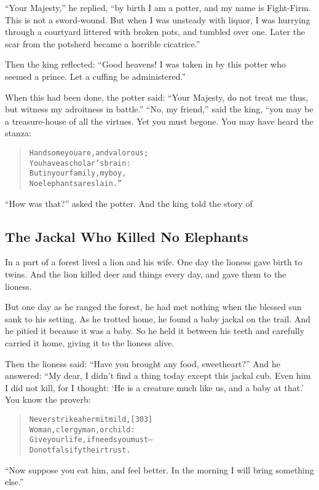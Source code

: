 \documentclass[article, twoside, 14pt]{memoir}
\renewenvironment{verbatim}{%
\begin{quote}%
\vskip -10pt%
\begin{alltt}\normalfont\large}{\end{alltt}%
\end{quote}%
\vskip -10pt
} %
\begin{document}
``Your Majesty,'' he replied,
``by birth I am a potter, and my name is Fight-Firm. This is not a sword-wound. But when I was unsteady with liquor, I was hurrying through a courtyard littered with broken pots, and tumbled over one. Later the scar from the potsherd became a horrible cicatrice.''

Then the king reflected:
``Good heavens! I was taken in by this potter who seemed a prince. Let a cuffing be administered.''

When this had been done, the potter said:
``Your Majesty, do not treat me thus, but witness my adroitness in battle.''
``No, my friend,'' said the king, “you may be a treasure-house of
all the virtues. Yet you must begone. You may have heard the
stanza:

\begin{verbatim}
Handsome you are, and valorous;
    You have a scholar's brain:
But in your family, my boy,
    No elephants are slain.”
\end{verbatim}
``How was that?'' asked the potter. And the king told the story of

\subsection{The Jackal Who Killed No Elephants}

\label{s70}

In a part of a forest lived a lion and his wife. One day the
lioness gave birth to twins. And the lion killed deer and things
every day, and gave them to the lioness.

But one day as he ranged the forest, he had met nothing when the
blessed sun sank to his setting. As he trotted home, he found a
baby jackal on the trail. And he pitied it because it was a baby.
So he held it between his teeth and carefully carried it home,
giving it to the lioness alive.

Then the lioness said: ``Have you brought any food, sweetheart?''
And he answered: “My dear, I didn't find a thing today except this
jackal cub. Even him I did not kill, for I thought:
`He is a creature much like us, and a baby at that.' You know the
proverb:

\begin{verbatim}
Never strike a hermit mild,                             [303]
Woman, clergyman, or child:
Give your life, if needs you must--
Do not falsify their trust.
\end{verbatim}
``Now suppose you eat him, and feel better. In the morning I will bring something else.''
\end{document}
